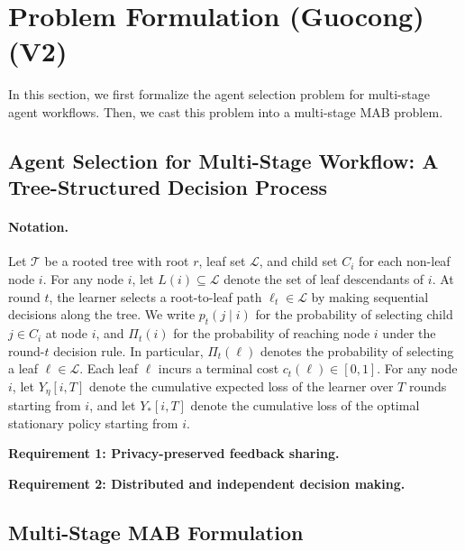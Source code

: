 
\section{Problem Formulation (Guocong){\color{red}(V2)}}


In this section, we first formalize the agent selection problem for multi-stage agent workflows. Then, we cast this problem into a multi-stage MAB problem.

\subsection{Agent Selection for Multi-Stage Workflow: A Tree-Structured Decision Process}

\paragraph{Notation.}
Let $\mathcal{T}$ be a rooted tree with root $r$, leaf set $\mathcal{L}$, and child set $C_i$ for each non-leaf node $i$. For any node $i$, let $L(i) \subseteq \mathcal{L}$ denote the set of leaf descendants of $i$. At round $t$, the learner selects a root-to-leaf path $\ell_t \in \mathcal{L}$ by making sequential decisions along the tree. We write $p_t(j \mid i)$ for the probability of selecting child $j \in C_i$ at node $i$, and $\Pi_t(i)$ for the probability of reaching node $i$ under the round-$t$ decision rule. In particular, $\Pi_t(\ell)$ denotes the probability of selecting a leaf $\ell \in \mathcal{L}$. Each leaf $\ell$ incurs a terminal cost $c_t(\ell) \in [0,1]$. For any node $i$, let $Y_\eta[i,T]$ denote the cumulative expected loss of the learner over $T$ rounds starting from $i$, and let $Y_\ast[i,T]$ denote the cumulative loss of the optimal stationary policy starting from $i$.

\textbf{Requirement 1: Privacy-preserved feedback sharing.}

\textbf{Requirement 2: Distributed and independent decision making.}

\subsection{Multi-Stage MAB Formulation}


